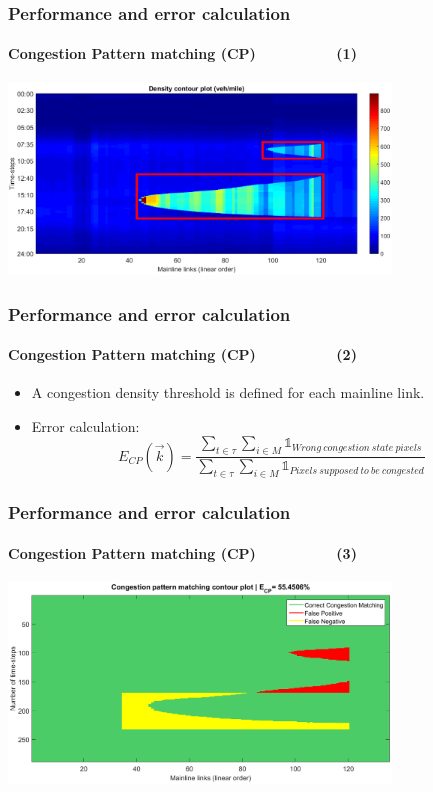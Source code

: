 \documentclass[fleqn]{beamer}
\begin{document}
\begin{frame}
	\centering
	\frametitle{Performance and error calculation}
	\framesubtitle{Congestion Pattern matching (CP)~~~~~~~~~~(1)}
	\includegraphics[width=4in]{figures/beats_contour.png}
\end{frame}



\begin{frame}
	\frametitle{Performance and error calculation}
	\framesubtitle{Congestion Pattern matching (CP)~~~~~~~~~~(2)}
		\begin{itemize}
			\item A congestion density threshold is defined for each mainline link.
			\item Error calculation: 
				\begin{equation*}
					E_{CP}(\vec{k})=\frac{\sum_{t\in{\tau}}\sum_{i\in{M}}\mathds{1}_{Wrong\ congestion\ state\ pixels}}{\sum_{t\in{\tau}}\sum_{i\in{M}}\mathds{1}_{Pixels\ supposed\ to\ be\ congested}}
				\end{equation*}
		\end{itemize}
\end{frame}



\begin{frame}
	\centering
	\frametitle{Performance and error calculation}
	\framesubtitle{Congestion Pattern matching (CP)~~~~~~~~~~(3)}
	\includegraphics[width=4in]{figures/cp_example.png}
\end{frame}
\end{document}
